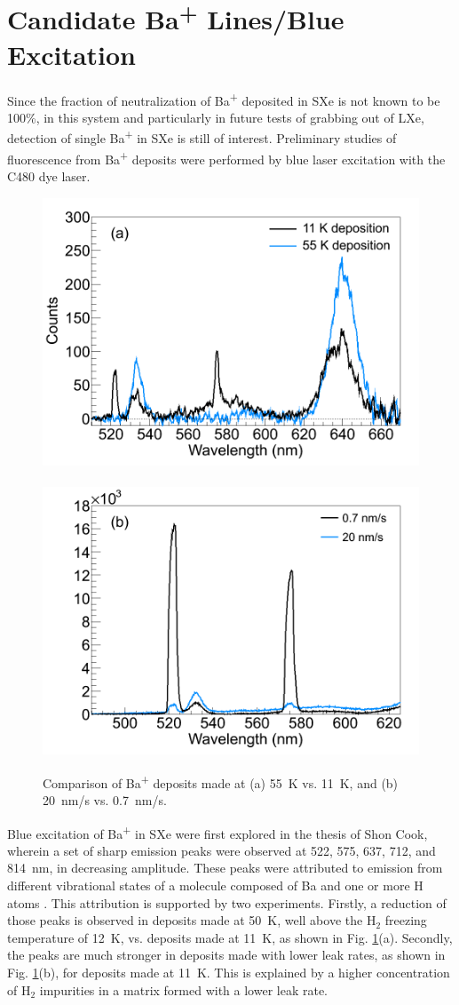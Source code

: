 \section{Candidate Ba\textsuperscript{+} Lines/Blue Excitation}
\label{sec:BaPlus}

Since the fraction of neutralization of Ba\textsuperscript{+} deposited in SXe is not known to be 100\%, in this system and particularly in future tests of grabbing out of LXe, detection of single Ba\textsuperscript{+} in SXe is still of interest.  Preliminary studies of fluorescence from Ba\textsuperscript{+} deposits were performed by blue laser excitation with the C480 dye laser.

\begin{figure} %
        \centering
                \includegraphics[width=.5\textwidth]{figures/BaHx_a.png}
                ~
                \includegraphics[width=.5\textwidth]{figures/BaHx_b.png}
                \caption{Comparison of Ba\textsuperscript{+} deposits made at (a) 55~K vs. 11~K, and (b) 20~nm/s vs. 0.7~nm/s.\cite{Mong2015}}
\label{fig:BaHx}
\end{figure}

Blue excitation of Ba\textsuperscript{+} in SXe were first explored in the thesis of Shon Cook, wherein a set of sharp emission peaks were observed at 522, 575, 637, 712, and 814~nm, in decreasing amplitude.  These peaks were attributed to emission from different vibrational states of a molecule composed of Ba and one or more H atoms \cite{Shon}.  This attribution is supported by two experiments.  Firstly, a reduction of those peaks is observed in deposits made at 50~K, well above the H$_{2}$ freezing temperature of 12~K, vs. deposits made at 11~K, as shown in Fig. \ref{fig:BaHx}(a).  Secondly, the peaks are much stronger in deposits made with lower leak rates, as shown in Fig. \ref{fig:BaHx}(b), for deposits made at 11~K.  This is explained by a higher concentration of H$_{2}$ impurities in a matrix formed with a lower leak rate.

